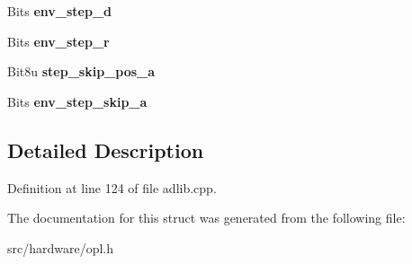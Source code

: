 \begin{DoxyCompactItemize}
\item 
\hypertarget{structOPL2_1_1operator__struct_a1eafc33fe9230a83a3de9a068ebd811f}{Bits {\bfseries env\-\_\-step\-\_\-d}}\label{structOPL2_1_1operator__struct_a1eafc33fe9230a83a3de9a068ebd811f}

\item 
\hypertarget{structOPL2_1_1operator__struct_a39943690f5b7452d5001deda6e629402}{Bits {\bfseries env\-\_\-step\-\_\-r}}\label{structOPL2_1_1operator__struct_a39943690f5b7452d5001deda6e629402}

\item 
\hypertarget{structOPL2_1_1operator__struct_abd4b47331b7433925b9247d0f7e62420}{Bit8u {\bfseries step\-\_\-skip\-\_\-pos\-\_\-a}}\label{structOPL2_1_1operator__struct_abd4b47331b7433925b9247d0f7e62420}

\item 
\hypertarget{structOPL2_1_1operator__struct_ad5f26117bea2737d9c1bc3f99f44b3a8}{Bits {\bfseries env\-\_\-step\-\_\-skip\-\_\-a}}\label{structOPL2_1_1operator__struct_ad5f26117bea2737d9c1bc3f99f44b3a8}

\end{DoxyCompactItemize}


\subsection{Detailed Description}


Definition at line 124 of file adlib.\-cpp.



The documentation for this struct was generated from the following file\-:\begin{DoxyCompactItemize}
\item 
src/hardware/opl.\-h\end{DoxyCompactItemize}
